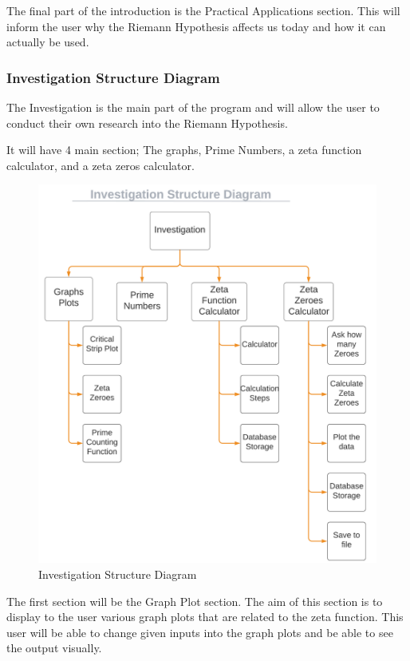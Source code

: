 \documentclass[12pt]{article}
\begin{document}
The final part of the introduction is the Practical Applications section. This will inform the user why the Riemann Hypothesis affects us today and how it can actually be used.

\clearpage
\subsubsection{Investigation Structure Diagram}
The Investigation is the main part of the program and will allow the user to conduct their own research into the Riemann Hypothesis.

It will have 4 main section; The graphs, Prime Numbers, a zeta function calculator, and a zeta zeros calculator.

\begin{figure}[h]
    \centering
    \captionsetup{justification=centering}
    \includegraphics[scale=0.5]{investigation-structure-diagram}
    \caption{Investigation Structure Diagram}
\end{figure}

The first section will be the Graph Plot section. The aim of this section is to display to the user various graph plots that are related to the zeta function. This user will be able to change given inputs into the graph plots and be able to see the output visually.
\end{document}
